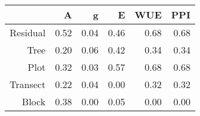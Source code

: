 \begin{tabular}{rrrrrr}
  \hline
 & A & g & E & WUE & PPI \\ 
  \hline
Residual & 0.52 & 0.04 & 0.46 & 0.68 & 0.68 \\ 
  Tree & 0.20 & 0.06 & 0.42 & 0.34 & 0.34 \\ 
  Plot & 0.32 & 0.03 & 0.57 & 0.68 & 0.68 \\ 
  Transect & 0.22 & 0.04 & 0.00 & 0.32 & 0.32 \\ 
  Block & 0.38 & 0.00 & 0.05 & 0.00 & 0.00 \\ 
   \hline
\end{tabular}
